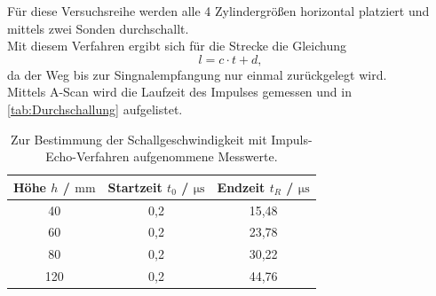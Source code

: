   Für diese Versuchsreihe werden alle 4 Zylindergrößen horizontal platziert und mittels zwei Sonden durchschallt.\\
  Mit diesem Verfahren ergibt sich für die Strecke die Gleichung 
  \begin{equation*}
    l = c \cdot t + d,
  \end{equation*}
  da der Weg bis zur Singnalempfangung nur einmal zurückgelegt wird.\\
  Mittels A-Scan wird die Laufzeit des Impulses gemessen und in \autoref{tab:Durchschallung} aufgelistet.
  \begin{table}
    \centering
    \caption{Zur Bestimmung der Schallgeschwindigkeit mit Impuls-Echo-Verfahren aufgenommene Messwerte.}
    \label{tab:Durchschallung}
    \begin{tabular}{c | c c}
      Höhe $h$ / $\si{\milli\meter}$ & Startzeit $t_0$ / $\si{\micro\second}$ & Endzeit $t_R$ / $\si{\micro\second}$ \\
        \midrule
        40   & 0,2 & 15,48\\
        60   & 0,2 & 23,78\\
        80   & 0,2 & 30,22\\
        120  & 0,2 & 44,76\\
        \bottomrule
      \end{tabular}
  \end{table}

